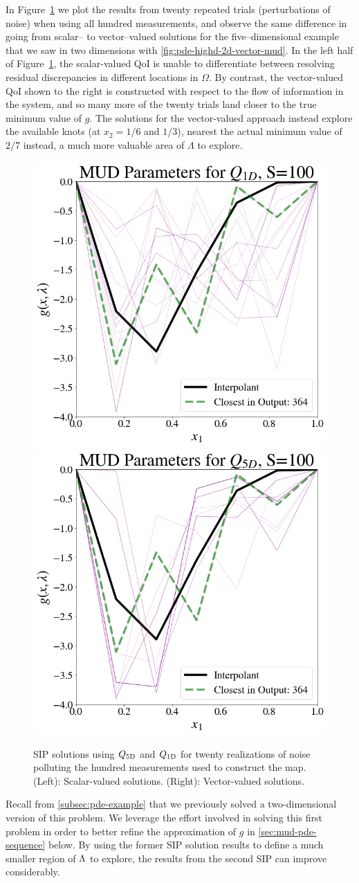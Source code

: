 In Figure~\ref{fig:pde-highd-5d-mud} we plot the results from twenty repeated trials (perturbations of noise) when using all hundred measurements, and observe the same difference in going from scalar-- to vector--valued solutions for the five--dimensional example that we saw in two dimensions with \ref{fig:pde-highd-2d-vector-mud}.
In the left half of Figure~\ref{fig:pde-highd-5d-mud}, the scalar-valued QoI is unable to differentiate between resolving residual discrepancies in different locations in $\Omega$.
By contrast, the vector-valued QoI shown to the right is constructed with respect to the flow of information in the system, and so many more of the twenty trials land closer to the true minimum value of $g$.
The solutions for the vector-valued approach instead explore the available knots (at $x_2=1/6$ and $1/3$), nearest the actual minimum value of $2/7$ instead, a much more valuable area of $\Lambda$ to explore.

\begin{figure}
\centering
  \includegraphics[width=0.45\linewidth]{figures/pde-highd/pde-highd_pair_D5-1_m100}
  \includegraphics[width=0.45\linewidth]{figures/pde-highd/pde-highd_pair_D5-5_m100}
\caption{ SIP solutions using $Q_\text{5D}$ and $Q_\text{1D}$ for twenty realizations of noise polluting the hundred measurements used to construct the map.
(Left): Scalar-valued solutions.
(Right): Vector-valued solutions.
}
\label{fig:pde-highd-5d-mud}
\end{figure}


Recall from \ref{subsec:pde-example} that we previously solved a two-dimensional version of this problem.
We leverage the effort involved in solving this first problem in order to better refine the approximation of $g$ in \ref{sec:mud-pde-sequence} below.
By using the former SIP solution results to define a much smaller region of ${\Lambda}$ to explore, the results from the second SIP can improve considerably.

